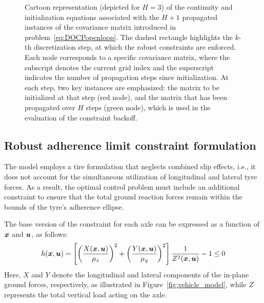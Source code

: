 {\begin{figure}
	\caption{Cartoon representation (depicted for $H=3$) of the continuity and initialization equations associated with the $H+1$ propagated instances of the covariance matrix introduced in problem~\eqref{eq:DOCPopenloop}. The dashed rectangle highlights the $k$-th discretization step, at which the robust constraints are enforced. Each node corresponds to a specific covariance matrix, where the subscript denotes the current grid index and the superscript indicates the number of propagation steps since initialization. At each step, two key instances are emphasized: the matrix to be initialized at that step (red node), and the matrix that has been propagated over $H$ steps (green node), which is used in the evaluation of the constraint backoff.}
	\label{fig:DOCPgrid}
\end{figure}
}{}

\subsection{Robust adherence limit constraint formulation}
The model employs a tire formulation that neglects combined slip effects, i.e., it does not account for the simultaneous utilization of longitudinal and lateral tyre forces. As a result, the optimal control problem must include an additional constraint to ensure that the total ground reaction forces remain within the bounds of the tyre's adherence ellipse. 

The base version of the constraint for each axle can be expressed as a function of $\boldsymbol{x}$ and $\boldsymbol{u}$, as follows:
\begin{equation}
	h(\boldsymbol{x},\boldsymbol{u}) = \left[ \left( \frac{X(\boldsymbol{x},\boldsymbol{u})}{\mu_x} \right)^2+ \left( \frac{Y(\boldsymbol{x},\boldsymbol{u})}{\mu_y}\right)^2\right]\frac{1}{Z^2(\boldsymbol{x},\boldsymbol{u})}-1\leq0
\end{equation}
Here, $X$ and $Y$ denote the longitudinal and lateral components of the in-plane ground forces, respectively, as illustrated in Figure~\ref{fig:vehicle_model}, while $Z$ represents the total vertical load acting on the axle. 

